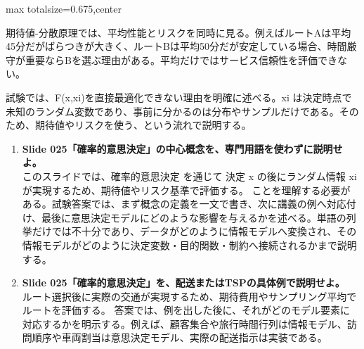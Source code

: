 \begin{adjustbox}{max totalsize={\textwidth}{0.675\textheight},center}
\begin{minipage}{\textwidth}
\begin{minipage}[t]{0.485\textwidth}
期待値-分散原理では、平均性能とリスクを同時に見る。例えばルートAは平均45分だがばらつきが大きく、ルートBは平均50分だが安定している場合、時間厳守が重要ならBを選ぶ理由がある。平均だけではサービス信頼性を評価できない。\par
試験では、F(x,xi)を直接最適化できない理由を明確に述べる。xi は決定時点で未知のランダム変数であり、事前に分かるのは分布やサンプルだけである。そのため、期待値やリスクを使う、という流れで説明する。\par
{}
\begin{enumerate}
\item \textbf{Slide 025「確率的意思決定」の中心概念を、専門用語を使わずに説明せよ。}\\このスライドでは、確率的意思決定 を通じて 決定 x の後にランダム情報 xi が実現するため、期待値やリスク基準で評価する。 ことを理解する必要がある。試験答案では、まず概念の定義を一文で書き、次に講義の例へ対応付け、最後に意思決定モデルにどのような影響を与えるかを述べる。単語の列挙だけでは不十分であり、データがどのように情報モデルへ変換され、その情報モデルがどのように決定変数・目的関数・制約へ接続されるかまで説明する。
\item \textbf{Slide 025「確率的意思決定」を、配送またはTSPの具体例で説明せよ。}\\ルート選択後に実際の交通が実現するため、期待費用やサンプリング平均でルートを評価する。 答案では、例を出した後に、それがどのモデル要素に対応するかを明示する。例えば、顧客集合や旅行時間行列は情報モデル、訪問順序や車両割当は意思決定モデル、実際の配送指示は実装である。
\end{enumerate}
\end{minipage}
\end{minipage}
\end{adjustbox}

